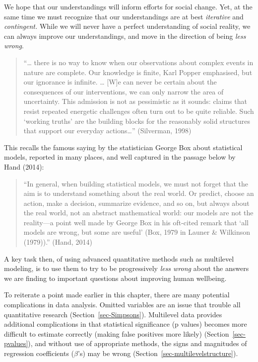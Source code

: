 \documentclass[
  letterpaper,
  DIV=11,
  numbers=noendperiod]{scrreprt}
\begin{document}
We hope that our understandings will inform efforts for social change.
Yet, at the same time we must recognize that our understandings are at
best \emph{iterative} and \emph{contingent.} While we will never have a
perfect understanding of social reality, we can always improve our
understandings, and move in the direction of being \emph{less wrong}.

\begin{quote}
``\ldots{} there is no way to know when our observations about complex
events in nature are complete. Our knowledge is finite, Karl Popper
emphasised, but our ignorance is infinite. \ldots{} {[}W{]}e can never
be certain about the consequences of our interventions, we can only
narrow the area of uncertainty. This admission is not as pessimistic as
it sounds: claims that resist repeated energetic challenges often turn
out to be quite reliable. Such `working truths' are the building blocks
for the reasonably solid structures that support our everyday
actions\ldots{}'' (Silverman, 1998) 
\end{quote}

This recalls the famous saying by the statistician George Box about
statistical models, reported in many places, and well captured in the
passage below by Hand (2014):

\begin{quote}
``In general, when building statistical models, we must not forget that
the aim is to understand something about the real world. Or predict,
choose an action, make a decision, summarize evidence, and so on, but
always about the real world, not an abstract mathematical world: our
models are not the reality---a point well made by George Box in his
oft-cited remark that `all models are wrong, but some are useful' (Box,
1979 in Launer \& Wilkinson (1979)).'' (Hand, 2014) 
\end{quote}

A key task then, of using advanced quantitative methods such as
multilevel modeling, is to use them to try to be progressively
\emph{less wrong} about the answers we are finding to important
questions about improving human wellbeing. 

To reiterate a point made earlier in this chapter, there are many
potential complications in data analysis. Omitted variables are an issue
that trouble all quantitative research (Section~\ref{sec-Simpsons}).
Multilevel data provides additional complications in that statistical
significance (p values) becomes more difficult to estimate correctly
(making false positives more likely) (Section~\ref{sec-pvalues}), and
without use of appropriate methods, the signs and magnitudes of
regression coefficients (\(\beta\)'s) may be wrong
(Section~\ref{sec-multilevelstructure}).
\end{document}
